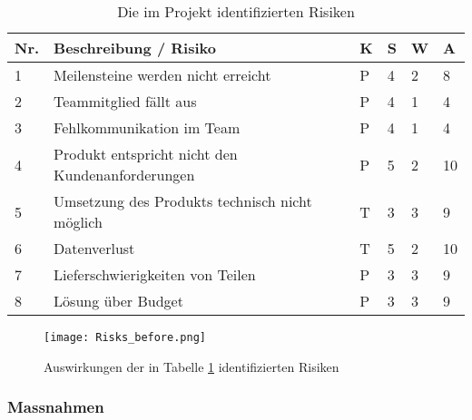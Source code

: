 \vspace{1em}
\noindent
\begin{table}[htb]
	\begin{tabularx}{\textwidth}{|l|X|l|l|l||l|}
		\hline
		\textbf{Nr.} & \textbf{Beschreibung / Risiko} & \textbf{K} & \textbf{S} & \textbf{W} & \textbf{A} \\
		\hline
		1 & Meilensteine werden nicht erreicht & P & 4 & 2 & 8 \\
		\hline
		2 & Teammitglied fällt aus & P & 4 & 1 & 4 \\
		\hline
		3 & Fehlkommunikation im Team & P & 4 & 1 & 4 \\
		\hline
		4 & Produkt entspricht nicht den Kundenanforderungen & P & 5 & 2 & 10 \\
		\hline
		5 & Umsetzung des Produkts technisch nicht möglich & T & 3 & 3 & 9 \\
		\hline
		6 & Datenverlust & T & 5 & 2 & 10 \\
		\hline
		7 & Lieferschwierigkeiten von Teilen & P & 3 & 3 & 9 \\
		\hline
		8 & Lösung über Budget & P & 3 & 3 & 9\\
		\hline
	\end{tabularx}
	\caption{Die im Projekt identifizierten Risiken}
	\label{tbl:Risks}
\end{table}

\vspace{1em}

\begin{figure}[h!]
	\centering
	\texttt{[image: Risks\_before.png]}
	\caption{Auswirkungen der in Tabelle \ref{tbl:Risks} identifizierten Risiken}
\end{figure}

\newpage

\subsubsection{Massnahmen}


